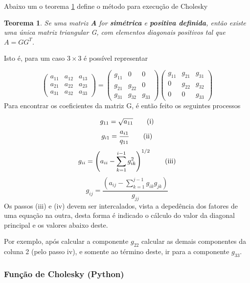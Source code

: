 \documentclass[
]{book}
\newtheorem{theorem}{Teorema}
\begin{document}
Abaixo um o teorema \ref{thm:cho} define o método para execução de Cholesky

\begin{theorem}
\protect\hypertarget{thm:cho}{}\label{thm:cho}Se uma matriz \textbf{A} for \textbf{simétrica} e \textbf{positiva definida}, então \emph{existe uma única} matriz triangular G, com elementos diagonais positivos tal que \(A = GG^T\).
\end{theorem}

Isto é, para um caso \(3 \times 3\) é possível representar

\[\begin{pmatrix} 
a_{11} & a_{12} & a_{13} \\
a_{21} & a_{22} & a_{23} \\
a_{31} & a_{32} & a_{33} 
\end{pmatrix} = 
\begin{pmatrix}
g_{11} & 0 & 0 \\
g_{21} & g_{22} & 0 \\
g_{31} & g_{32} & g_{33} 
\end{pmatrix}
\begin{pmatrix}
g_{11} & g_{21} & g_{31} \\
0 & g_{22} & g_{32} \\
0 & 0 & g_{33} 
\end{pmatrix}
\]
Para encontrar os coeficientes da matriz G, é então feito os seguintes processos

\[
g_{11} = \sqrt{a_{11}} \tag{i}\\
\]
\[
g_{i1} = \frac{a_{i1}}{q_{11}} \tag{ii}\\
\]
\[
g_{ii} = \left(a_{ii} - \sum_{k=1}^{i-1} g_{ik}^2 \right)^{1/2} \tag{iii}\\
\]
\[
g_{ij} = \frac{\left(a_{ij} - \sum_{k=1}^{j-1} g_{ik}g_{jk} \right)}{g_{jj}} \tag{iv}
\]
Os passos (iii) e (iv) devem ser intercalados, vista a depedência dos fatores de uma equação na outra, desta forma é indicado o cálculo do valor da diagonal principal e os valores abaixo deste.

Por exemplo, após calcular a componente \(g_{22}\) calcular as demais componentes da coluna 2 (pelo passo iv), e somente ao término deste, ir para a componente \(g_{33}\).

\hypertarget{funuxe7uxe3o-de-cholesky-python}{%
\subsubsection{Função de Cholesky (Python)}\label{funuxe7uxe3o-de-cholesky-python}}
\end{document}
